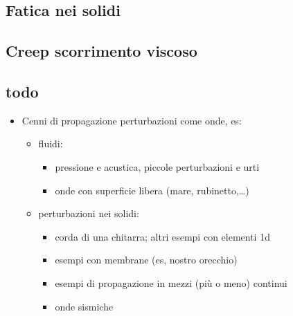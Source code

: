 \documentclass[letterpaper,10pt,italian]{jupyterBook}
\begin{document}
\subsection{Fatica nei solidi}
\label{\detokenize{ch/continuum/solids:fatica-nei-solidi}}\label{\detokenize{ch/continuum/solids:continuum-solids-fatigue}}

\subsection{Creep \sphinxhyphen{} scorrimento viscoso}
\label{\detokenize{ch/continuum/solids:creep-scorrimento-viscoso}}\label{\detokenize{ch/continuum/solids:continuum-solids-creep}}

\subsection{todo}
\label{\detokenize{ch/continuum/solids:todo}}\begin{itemize}
\item {} 
\sphinxAtStartPar
Cenni di propagazione perturbazioni come onde, es:
\begin{itemize}
\item {} 
\sphinxAtStartPar
fluidi:
\begin{itemize}
\item {} 
\sphinxAtStartPar
pressione e acustica, piccole perturbazioni e urti

\item {} 
\sphinxAtStartPar
onde con superficie libera (mare, rubinetto,…)

\end{itemize}

\item {} 
\sphinxAtStartPar
perturbazioni nei solidi:
\begin{itemize}
\item {} 
\sphinxAtStartPar
corda di una chitarra; altri esempi con elementi 1d

\item {} 
\sphinxAtStartPar
esempi con membrane (es, nostro orecchio)

\item {} 
\sphinxAtStartPar
esempi di propagazione in mezzi (più o meno) continui

\item {} 
\sphinxAtStartPar
onde sismiche

\end{itemize}

\end{itemize}

\end{itemize}
\end{document}
